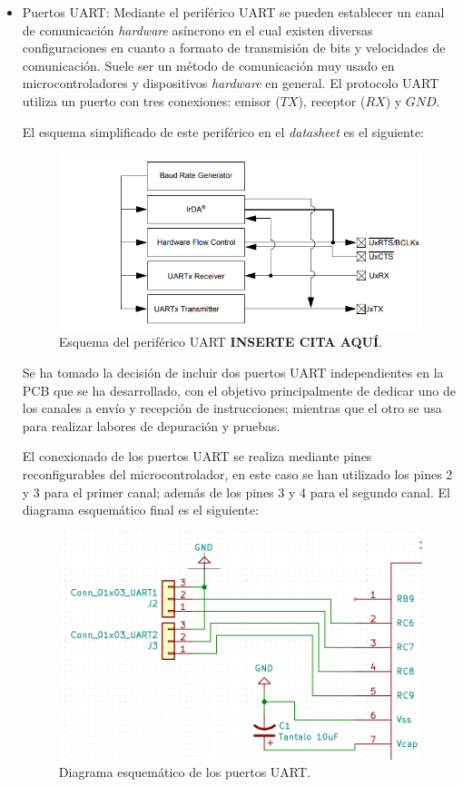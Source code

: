 \begin{itemize}
    \item Puertos UART: Mediante el periférico UART se pueden establecer un canal de comunicación \textit{hardware} asíncrono en el cual existen diversas configuraciones en cuanto a formato de transmisión de bits y velocidades de comunicación. Suele ser un método de comunicación muy usado en microcontroladores y dispositivos \textit{hardware} en general. El protocolo UART utiliza un puerto con tres conexiones: emisor ($TX$), receptor ($RX$) y $GND$.
    
    El esquema simplificado de este periférico en el \textit{datasheet} es el siguiente:
    
    \begin{figure}[H]
    \centering 
    \includegraphics[width=.6\linewidth]{pictures/UARTdatasheet.PNG}
    \caption{Esquema del periférico UART \textbf{INSERTE CITA AQUÍ}.}
    \label{fig:CAMBIAR!!!!!!!!!!}
    \end{figure}
    
    Se ha tomado la decisión de incluir dos puertos UART independientes en la \ac{PCB} que se ha desarrollado, con el objetivo principalmente de dedicar uno de los canales a envío y recepción de instrucciones; mientras que el otro se usa para realizar labores de depuración y pruebas.
    
    El conexionado de los puertos UART  se realiza mediante pines reconfigurables del microcontrolador, en este caso se han utilizado los pines 2 y 3 para el primer canal; además de los pines 3 y 4 para el segundo canal. El diagrama esquemático final es el siguiente:
    
    \begin{figure}[H]
    \centering 
    \includegraphics[width=.6\linewidth]{pictures/UART.PNG}
    \caption{Diagrama esquemático de los puertos UART.}
    \label{fig:CAMBIAR!!!!!!!!!!}
    \end{figure}
    

\end{itemize}
